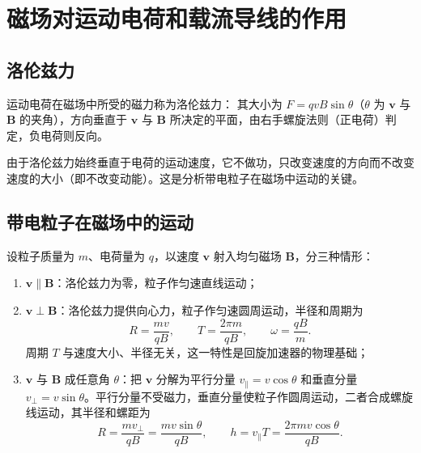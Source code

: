 \section{磁场对运动电荷和载流导线的作用}
    \subsection{洛伦兹力}
    运动电荷在磁场中所受的磁力称为洛伦兹力：
    其大小为 $F=qvB\sin\theta$（$\theta$ 为 $\boldsymbol{v}$ 与 $\boldsymbol{B}$ 的夹角），方向垂直于 $\boldsymbol{v}$ 与 $\boldsymbol{B}$ 所决定的平面，由右手螺旋法则（正电荷）判定，负电荷则反向。

    由于洛伦兹力始终垂直于电荷的运动速度，它不做功，只改变速度的方向而不改变速度的大小（即不改变动能）。这是分析带电粒子在磁场中运动的关键。

    \subsection{带电粒子在磁场中的运动}
    设粒子质量为 $m$、电荷量为 $q$，以速度 $\boldsymbol{v}$ 射入均匀磁场 $\boldsymbol{B}$，分三种情形：
    \begin{enumerate}
        \item $\boldsymbol{v}\parallel\boldsymbol{B}$：洛伦兹力为零，粒子作匀速直线运动；
        \item $\boldsymbol{v}\perp\boldsymbol{B}$：洛伦兹力提供向心力，粒子作匀速圆周运动，半径和周期为
        \[
        R=\frac{mv}{qB},\qquad T=\frac{2\pi m}{qB},\qquad \omega=\frac{qB}{m}.
        \]
        周期 $T$ 与速度大小、半径无关，这一特性是回旋加速器的物理基础；
        \item $\boldsymbol{v}$ 与 $\boldsymbol{B}$ 成任意角 $\theta$：把 $\boldsymbol{v}$ 分解为平行分量 $v_{\parallel}=v\cos\theta$ 和垂直分量 $v_{\perp}=v\sin\theta$。平行分量不受磁力，垂直分量使粒子作圆周运动，二者合成螺旋线运动，其半径和螺距为
        \[
        R=\frac{mv_{\perp}}{qB}=\frac{mv\sin\theta}{qB},\qquad
        h=v_{\parallel}T=\frac{2\pi mv\cos\theta}{qB}.
        \]
    \end{enumerate}

